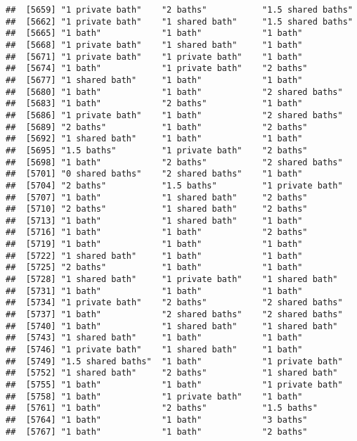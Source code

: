 \documentclass[
]{article}
\begin{document}
\begin{verbatim}
##  [5659] "1 private bath"    "2 baths"           "1.5 shared baths" 
##  [5662] "1 private bath"    "1 shared bath"     "1.5 shared baths" 
##  [5665] "1 bath"            "1 bath"            "1 bath"           
##  [5668] "1 private bath"    "1 shared bath"     "1 bath"           
##  [5671] "1 private bath"    "1 private bath"    "1 bath"           
##  [5674] "1 bath"            "1 private bath"    "2 baths"          
##  [5677] "1 shared bath"     "1 bath"            "1 bath"           
##  [5680] "1 bath"            "1 bath"            "2 shared baths"   
##  [5683] "1 bath"            "2 baths"           "1 bath"           
##  [5686] "1 private bath"    "1 bath"            "2 shared baths"   
##  [5689] "2 baths"           "1 bath"            "2 baths"          
##  [5692] "1 shared bath"     "1 bath"            "1 bath"           
##  [5695] "1.5 baths"         "1 private bath"    "2 baths"          
##  [5698] "1 bath"            "2 baths"           "2 shared baths"   
##  [5701] "0 shared baths"    "2 shared baths"    "1 bath"           
##  [5704] "2 baths"           "1.5 baths"         "1 private bath"   
##  [5707] "1 bath"            "1 shared bath"     "2 baths"          
##  [5710] "2 baths"           "1 shared bath"     "2 baths"          
##  [5713] "1 bath"            "1 shared bath"     "1 bath"           
##  [5716] "1 bath"            "1 bath"            "2 baths"          
##  [5719] "1 bath"            "1 bath"            "1 bath"           
##  [5722] "1 shared bath"     "1 bath"            "1 bath"           
##  [5725] "2 baths"           "1 bath"            "1 bath"           
##  [5728] "1 shared bath"     "1 private bath"    "1 shared bath"    
##  [5731] "1 bath"            "1 bath"            "1 bath"           
##  [5734] "1 private bath"    "2 baths"           "2 shared baths"   
##  [5737] "1 bath"            "2 shared baths"    "2 shared baths"   
##  [5740] "1 bath"            "1 shared bath"     "1 shared bath"    
##  [5743] "1 shared bath"     "1 bath"            "1 bath"           
##  [5746] "1 private bath"    "1 shared bath"     "1 bath"           
##  [5749] "1.5 shared baths"  "1 bath"            "1 private bath"   
##  [5752] "1 shared bath"     "2 baths"           "1 shared bath"    
##  [5755] "1 bath"            "1 bath"            "1 private bath"   
##  [5758] "1 bath"            "1 private bath"    "1 bath"           
##  [5761] "1 bath"            "2 baths"           "1.5 baths"        
##  [5764] "1 bath"            "1 bath"            "3 baths"          
##  [5767] "1 bath"            "1 bath"            "2 baths"          

\end{verbatim}
\end{document}
